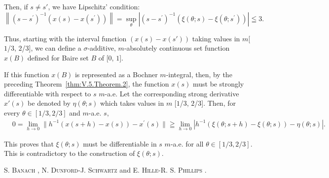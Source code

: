 Then, if $s \neq s'$, we have Lipschitz' condition: 
\[
\left\| (s - s ^{\prime}) ^{-1} (x (s) - x (s ^{\prime})) \right\| = \sup\limits _{\theta} \left| (s - s ^{\prime}) ^{-1} (\xi (\theta ; s) - \xi (\theta ; s ^{\prime})) \right| \leqq 3.
\]

Thus, starting with the interval function $(x(s) - x(s'))$ taking values in $m$[$1$/$3$, $2$/$3$], we can define a $\sigma$-additive, $m$-absolutely continuous set function $x(B)$ defined for Baire set $B$ of [$0$, $1$]. 

If this function $x(B)$ is represented as a Bochner $m$-integral, then, by the preceding Theorem~\ref{thm:V.5.Theorem.2}, the function $x(s)$ must be strongly differentiable with respect to $s$ $m$-a.e. Let the corresponding strong derivative $x'(s)$ be denoted by $\eta(\theta; s)$ which takes values in $m$ [$1$/$3$, $2$/$3$]. Then, for 
every $\theta \in [1 / 3,2 / 3]$ and $m$-a.e. $s$, 
\[
\begin{aligned}
&0 = \lim\limits _{h \to 0} \| h ^{-1} (x (s + h) - x (s)) - x ^{\prime} (s) \|  \geqq \lim\limits _{h \to 0} | h ^{-1} (\xi (\theta ; s + h) - \xi (\theta ; s)) - \eta (\theta ; s) |.
\end{aligned}
\]

This proves that $\xi(\theta; s)$ must be differentiable in $s$ $m$-a.e. for all $\theta \in [1/3, 2/3]$. This is contradictory to the construction of $\xi(\theta; s)$. 


S. \textsc{Banach} \cite{banach9}, N. \textsc{Dunford}-J. \textsc{Schwartz} \cite{dunford44} and E. \textsc{Hille}-R. S. \textsc{Phillips} \cite{hille97}. 

